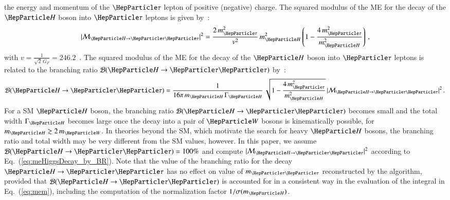 the energy and momentum of the $\Pgt$ lepton of positive (negative) charge.
The squared modulus of the ME for the decay of the $\PHiggs$ boson
into $\Pgt$ leptons is given by~\cite{me_HtoTauTau}:
\begin{equation}
\vert \mathcal{M}_{\PHiggs \to \Pgt\Pgt} \vert^{2} = 
 \frac{2 \, m_{\Pgt}^{2}}{v^{2}} \, m_{\PHiggs}^{2} \left( 1 - \frac{4 \, m_{\Pgt}^{2}}{m_{\PHiggs}^{2}} \right) \, ,
\label{eq:meHiggsDecay}
\end{equation}
with $v = \frac{1}{\sqrt{2} \, G_{F}} = 246.2$~\GeV.
The squared modulus of the ME for the decay of the $\PHiggs$ boson
into $\Pgt$ leptons is related to the branching ratio $\mathcal{B}(\PHiggs \to \Pgt\Pgt)$
by~\cite{me_HtoTauTau}:
\begin{equation}
\mathcal{B}(\PHiggs \to \Pgt\Pgt) 
 = \frac{1}{16\pi \, m_{\PHiggs} \, \Gamma_{\PHiggs}} \, \sqrt{1 - \frac{4 \, m_{\Pgt}^{2}}{m_{\PHiggs}^{2}}} \, \vert \mathcal{M}_{\PHiggs \to \Pgt\Pgt} \vert^{2} \, .
\label{eq:meHiggsDecay_by_BR}
\end{equation}
For a SM $\PHiggs$ boson,
the branching ratio $\mathcal{B}(\PHiggs \to \Pgt\Pgt)$ becomes small and the total width $\Gamma_{\PHiggs}$ becomes large
once the decay into a pair of $\PW$ bosons is kinematically possible,
\ie for $m_{\PHiggs} \gtrsim 2 \, m_{\PW}$.
In theories beyond the SM, which motivate the search for heavy $\PHiggs$ bosons,
the branching ratio and total width may be very different from the SM
values, however.
In this paper, we assume $\mathcal{B}(\PHiggs \to \Pgt\Pgt) = 100\%$ and compute $\vert \mathcal{M}_{\PHiggs \to \Pgt\Pgt} \vert^{2}$ according to Eq.~(\ref{eq:meHiggsDecay_by_BR}).
Note that the value of the branching ratio for the decay $\PHiggs \to \Pgt\Pgt$ 
has no effect on value of $m_{\Pgt\Pgt}$ reconstructed by the algorithm, 
provided that $\mathcal{B}(\PHiggs \to \Pgt\Pgt)$ is accounted for in
a consistent way in the evaluation of the integral in
Eq.~(\ref{eq:mem}), including the computation of the normalization factor $1/\sigma(m_{\PHiggs})$.

